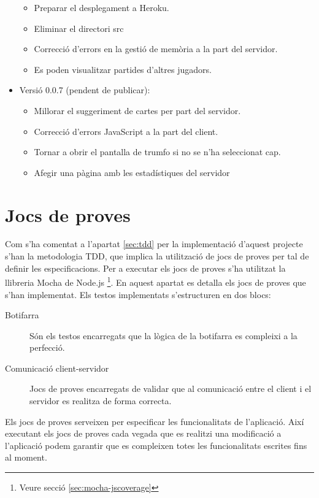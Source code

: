 \begin{itemize}
{\begin{itemize}
        \item{Preparar el desplegament a Heroku.}
        \item{Eliminar el directori src}
        \item{Correcció d'errors en la gestió de memòria a la part del servidor.}
        \item{Es poden visualitzar partides d'altres jugadors.}
    \end{itemize}
}
\item{Versió 0.0.7 (pendent de publicar):
    \begin{itemize}
        \item{Millorar el suggeriment de cartes per part del servidor.}
        \item{Correcció d'errors JavaScript a la part del client.}
        \item{Tornar a obrir el pantalla de trumfo si no se n'ha seleccionat cap. }
        \item{Afegir una pàgina amb les estadístiques del servidor}
    \end{itemize}
}
\end{itemize}

\section{Jocs de proves}

Com s'ha comentat a l'apartat \ref{sec:tdd} per la implementació d'aquest projecte s'han la metodologia TDD, que implica la utilització de jocs de proves per tal de definir les especificacions. Per a executar els jocs de proves s'ha utilitzat la llibreria Mocha de Node.js \footnote{Veure secció \ref{sec:mocha-jscoverage}}. En aquest apartat es detalla els jocs de proves que s'han implementat. Els testos implementats s'estructuren en dos blocs: 

\begin{description}
    \item[Botifarra]{ Són els testos encarregats que la lògica de la botifarra es compleixi a la perfecció.}
    \item[Comunicació client-servidor] {Jocs de proves encarregats de validar que al comunicació entre el client i el servidor es realitza de forma correcta.}
\end{description}

Els jocs de proves serveixen per especificar les funcionalitats de l'aplicació. Així executant els jocs de proves cada vegada que es realitzi una modificació a l'aplicació podem garantir que es compleixen totes les funcionalitats escrites fins al moment.

